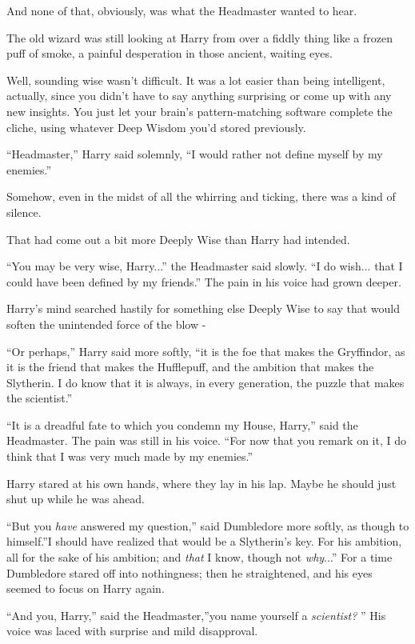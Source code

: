 And none of that, obviously, was what the Headmaster wanted to hear.

The old wizard was still looking at Harry from over a fiddly thing like
a frozen puff of smoke, a painful desperation in those ancient, waiting
eyes.

Well, sounding wise wasn't difficult. It was a lot easier than being
intelligent, actually, since you didn't have to say anything surprising
or come up with any new insights. You just let your brain's
pattern-matching software complete the cliche, using whatever Deep
Wisdom you'd stored previously.

``Headmaster,'' Harry said solemnly, ``I would rather not define myself
by my enemies.''

Somehow, even in the midst of all the whirring and ticking, there was a
kind of silence.

That had come out a bit more Deeply Wise than Harry had intended.

``You may be very wise, Harry...'' the Headmaster said slowly. ``I
do wish... that I could have been defined by my friends.'' The pain
in his voice had grown deeper.

Harry's mind searched hastily for something else Deeply Wise to say that
would soften the unintended force of the blow -

``Or perhaps,'' Harry said more softly, ``it is the foe that makes the
Gryffindor, as it is the friend that makes the Hufflepuff, and the
ambition that makes the Slytherin. I do know that it is always, in every
generation, the puzzle that makes the scientist.''

``It is a dreadful fate to which you condemn my House, Harry,'' said the
Headmaster. The pain was still in his voice. ``For now that you remark
on it, I do think that I was very much made by my enemies.''

Harry stared at his own hands, where they lay in his lap. Maybe he
should just shut up while he was ahead.

``But you \emph{have} answered my question,'' said Dumbledore more
softly, as though to himself.''I should have realized that would be a
Slytherin's key. For his ambition, all for the sake of his ambition; and
\emph{that} I know, though not \emph{why}...'' For a time
Dumbledore stared off into nothingness; then he straightened, and his
eyes seemed to focus on Harry again.

``And you, Harry,'' said the Headmaster,''you name yourself a
\emph{scientist?} '' His voice was laced with surprise and mild
disapproval.

